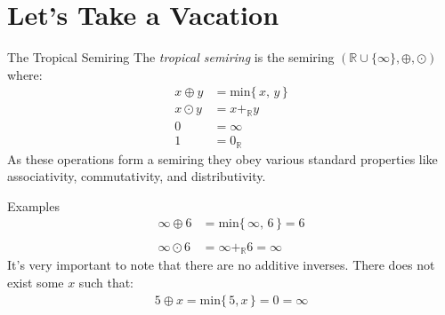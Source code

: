 \documentclass[usenames,dvipsnames]{beamer}
\newcommand{\mbb}[1]{\ensuremath{\mathbb{#1}}}     %
\newcommand{\minF}[1]{\ensuremath{\text{min}\{ \, #1 \, \}}}
\begin{document}
\section{Let's Take a Vacation}
\begin{frame}{The Tropical Semiring}
  The \textit{tropical semiring} is the semiring
  $(\mbb{R} \cup \{ \infty \}, \oplus, \odot)$ where:
  \begin{align*}
    x \oplus y  &= \minF{x, \, y} \\
    x \odot y &= x +_{\mathbb{R}} y \\
    0 &= \infty \\
    1 &= 0_{\mathbb{R}}
  \end{align*}
  As these operations form a semiring they obey various standard properties like
  associativity, commutativity, and distributivity.
\end{frame}
\begin{frame}{Examples}
\begin{align*}
  \infty \oplus 6 &= \minF{ \infty, \, 6 } = 6 \\
  {} \\
  \infty \odot 6 &= \infty +_{\mathbb{R}} 6 = \infty
\end{align*}
It's very important to note that there are no additive inverses.
There does not exist some $x$ such that:
\begin{align*}
  5 \oplus x = \minF{ 5, x } = 0 = \infty
\end{align*}
\end{frame}
\end{document}
